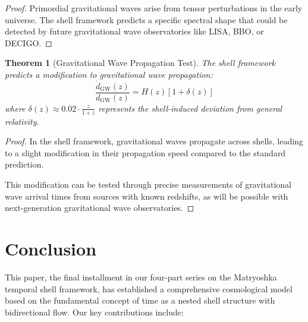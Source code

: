 \documentclass[12pt,a4paper]{article}
\newtheorem{theorem}{Theorem}[section]
\begin{document}
\begin{proof}
Primordial gravitational waves arise from tensor perturbations in the early universe. The shell framework predicts a specific spectral shape that could be detected by future gravitational wave observatories like LISA, BBO, or DECIGO.
\end{proof}

\begin{theorem}[Gravitational Wave Propagation Test]
\label{thm:gw-propagation}
The shell framework predicts a modification to gravitational wave propagation:
\begin{equation}
\frac{\dot{d}_{\text{GW}}(z)}{d_{\text{GW}}(z)} = H(z) \left[1 + \delta(z)\right]
\end{equation}
where $\delta(z) \approx 0.02 \cdot \frac{z}{1+z}$ represents the shell-induced deviation from general relativity.
\end{theorem}

\begin{proof}
In the shell framework, gravitational waves propagate across shells, leading to a slight modification in their propagation speed compared to the standard prediction.

This modification can be tested through precise measurements of gravitational wave arrival times from sources with known redshifts, as will be possible with next-generation gravitational wave observatories.
\end{proof}

\section{Conclusion}
\label{sec:conclusion}

This paper, the final installment in our four-part series on the Matryoshka temporal shell framework, has established a comprehensive cosmological model based on the fundamental concept of time as a nested shell structure with bidirectional flow. Our key contributions include:
\end{document}
